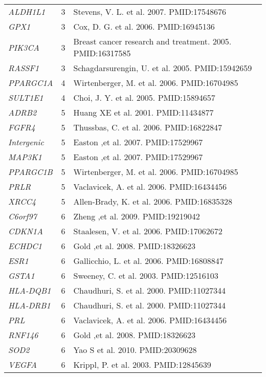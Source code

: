 \documentclass[10pt]{article}
\begin{document}
\begin{landscape}
\begin{center}
\begin{longtable}[H]{lcl}
\textit{ALDH1L1} & 3 & Stevens, V. L.  et al. 2007. PMID:17548676\\[2pt]
\textit{GPX1} & 3 & Cox, D. G.  et al. 2006. PMID:16945136\\[2pt]
\textit{PIK3CA} & 3 & Breast cancer research and treatment. 2005. PMID:16317585\\[2pt]
\textit{RASSF1} & 3 & Schagdarsurengin, U.  et al. 2005. PMID:15942659\\[2pt]
\textit{PPARGC1A} & 4 & Wirtenberger, M.  et al. 2006. PMID:16704985\\[2pt]
\textit{SULT1E1} & 4 & Choi, J. Y.  et al. 2005. PMID:15894657\\[2pt]
\textit{ADRB2} & 5 & Huang XE et al. 2001. PMID:11434877\\[2pt]
\textit{FGFR4} & 5 & Thussbas, C.  et al. 2006. PMID:16822847\\[2pt]
\textit{Intergenic} & 5 & Easton ,et al. 2007. PMID:17529967\\[2pt]
\textit{MAP3K1} & 5 & Easton ,et al. 2007. PMID:17529967\\[2pt]
\textit{PPARGC1B} & 5 & Wirtenberger, M.  et al. 2006. PMID:16704985\\[2pt]
\textit{PRLR} & 5 & Vaclavicek, A.  et al. 2006. PMID:16434456\\[2pt]
\textit{XRCC4} & 5 & Allen-Brady, K.  et al. 2006. PMID:16835328\\[2pt]
\textit{C6orf97} & 6 & Zheng ,et al. 2009. PMID:19219042\\[2pt]
\textit{CDKN1A} & 6 & Staalesen, V.  et al. 2006. PMID:17062672\\[2pt]
\textit{ECHDC1} & 6 & Gold ,et al. 2008. PMID:18326623\\[2pt]
\textit{ESR1} & 6 & Gallicchio, L.  et al. 2006. PMID:16808847\\[2pt]
\textit{GSTA1} & 6 & Sweeney, C.  et al. 2003. PMID:12516103\\[2pt]
\textit{HLA-DQB1} & 6 & Chaudhuri, S.  et al. 2000. PMID:11027344\\[2pt]
\textit{HLA-DRB1} & 6 & Chaudhuri, S.  et al. 2000. PMID:11027344\\[2pt]
\textit{PRL} & 6 & Vaclavicek, A.  et al. 2006. PMID:16434456\\[2pt]
\textit{RNF146} & 6 & Gold ,et al. 2008. PMID:18326623\\[2pt]
\textit{SOD2} & 6 & Yao S  et al.  2010. PMID:20309628\\[2pt]
\textit{VEGFA} & 6 & Krippl, P.  et al. 2003. PMID:12845639\\[2pt]

\end{longtable}
\end{center}
\end{landscape}
\end{document}
